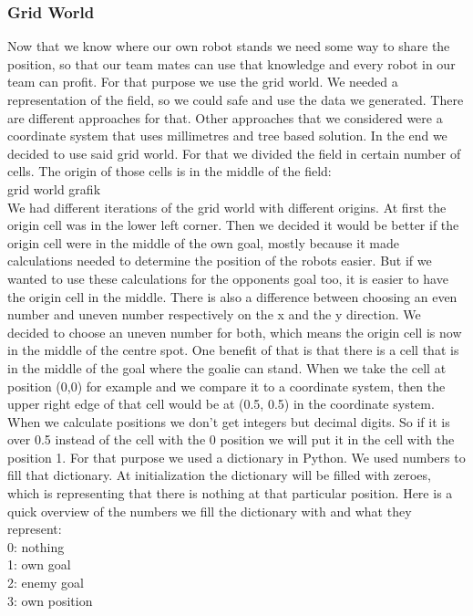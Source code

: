 \documentclass[lnicst,a4paper]{svmultln}
\begin{document}
\subsubsection{Grid World}
Now that we know where our own robot stands we need some way to share the position, so that our team mates can use that knowledge and every robot in our team can profit. For that purpose we use the grid world. We needed a representation of the field, so we could safe and use the data we generated. There are different approaches for that. Other approaches that we considered were a coordinate system that uses millimetres and tree based solution. In the end we decided to use said grid world. For that we divided the field in certain number of cells. The origin of those cells is in the middle of the field:\\
grid world grafik\\
We had different iterations of the grid world with different origins. At first the origin cell was in the lower left corner. Then we decided it would be better if the origin cell were in the middle of the own goal, mostly because it made calculations needed to determine the position of the robots easier. But if we wanted to use these calculations for the opponents goal too, it is easier to have the origin cell in the middle. There is also a difference between choosing an even number and uneven number respectively on the x and the y direction. We decided to choose an uneven number for both, which means the origin cell is now in the middle of the centre spot. One benefit of that is that there is a cell that is in the middle of the goal where the goalie can stand. When we take the cell at position (0,0) for example and we compare it to a coordinate system, then the upper right edge of that cell would be at (0.5, 0.5) in the coordinate system. When we calculate positions we don't get integers but decimal digits. So if it is over 0.5 instead of the cell with the 0 position we will put it in the cell with the position 1. 
For that purpose we used a dictionary in Python. We used numbers to fill that dictionary. At initialization the dictionary will be filled with zeroes, which is representing that there is nothing at that particular position. Here is a quick overview of the numbers we fill the dictionary with and what they represent:\\
0: nothing\\
1: own goal\\
2: enemy goal\\
3: own position\\
\end{document}
